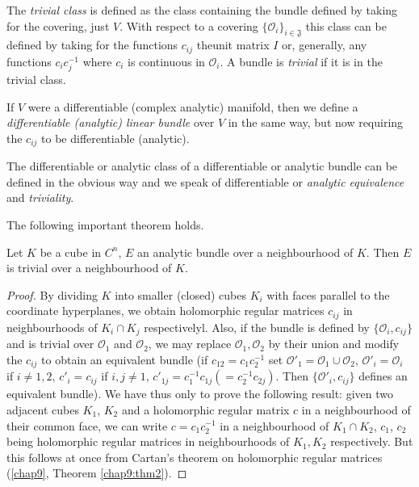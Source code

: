 The \textit{trivial class} is defined as the class containing the
bundle defined by taking for the covering, just $V$. With respect to a
covering $\{\mathscr{O}_i\}_{ i \in\mathfrak{J}}$ this class can be
defined by taking for the functions $c_{ij}$ the\pageoriginale unit
matrix $I$ or, generally, any functions $c_i c^{-1}_j$ where $c_i$ is
continuous in $\mathscr{O}_i$. A bundle is \textit{trivial} if it is
in the trivial class. 

If $V$ were a differentiable (complex analytic) manifold, then we
define a \textit{differentiable (analytic) linear bundle} over $V$ in
the same way, but now requiring the $c_{ij}$ to be differentiable
(analytic). 

The differentiable or analytic class of a differentiable or analytic
bundle can be defined in the obvious way and we speak of
differentiable or \textit{analytic equivalence} and
\textit{triviality}.

The following important theorem holds.

\begin{thm}\label{chap10:thm2}
Let $K$ be a cube in $C^n$, $E$ an analytic bundle over a
neighbourhood of $K$. Then $E$ is trivial over a neighbourhood of
$K$. 
\end{thm}

\begin{proof}
By dividing $K$ into smaller (closed) cubes $K_i$ with faces parallel
to the coordinate hyperplanes, we obtain holomorphic regular matrices
$c_{ij}$ in neighbourhoods of $K_i \cap K_j$ respectivelyl. Also, if
the bundle is defined by $\{\mathscr{O}_i, c_{ij}\}$ and is trivial
over $\mathscr{O}_1$ and $\mathscr{O}_2$, we may replace
$\mathscr{O}_1, \mathscr{O}_2$ by their union and modify the $c_{ij}$
to obtain an equivalent bundle (if $c_{12} = c_1 c^{-1}_2$ set
$\mathscr{O}'_1 = \mathscr{O}_1 \cup \mathscr{O}_2$, $\mathscr{O}'_i =
\mathscr{O}_i$ if $i \neq 1, 2$, $c'_i = c_{ij}$ if $i, j \neq 1$,
$c'_{1j} = c^{-1}_1 c_{1j} (= c^{-1}_2 c_{2j})$. Then
$\{\mathscr{O}'_i, c_{ij}\}$ defines an equivalent bundle). We have
thus only to prove the following result: given two adjacent cubes
$K_1$, $K_2$ and a holomorphic regular matrix $c$ in a neighbourhood
of their common face, we can write $c = c_1 c^{-1}_2$ in a
neighbourhood of $K_1 \cap K_2$, $c_1$, $c_2$ being holomorphic
regular matrices in neighbourhoods of $K_1, K_2$ respectively. But
this follows at once from Cartan's theorem on holomorphic regular
matrices (\ref{chap9}, Theorem \ref{chap9:thm2}). 
\end{proof}

